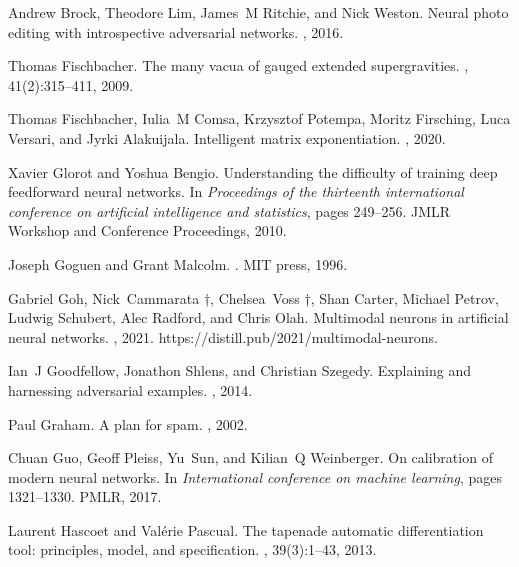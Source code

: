 \documentclass[11pt]{article}
\begin{document}
\begin{thebibliography}{10}

Andrew Brock, Theodore Lim, James~M Ritchie, and Nick Weston.
\newblock Neural photo editing with introspective adversarial networks.
, 2016.

Thomas Fischbacher.
\newblock The many vacua of gauged extended supergravities.
, 41(2):315--411, 2009.

Thomas Fischbacher, Iulia~M Comsa, Krzysztof Potempa, Moritz Firsching, Luca
  Versari, and Jyrki Alakuijala.
\newblock Intelligent matrix exponentiation.
, 2020.

Xavier Glorot and Yoshua Bengio.
\newblock Understanding the difficulty of training deep feedforward neural
  networks.
\newblock In {\em Proceedings of the thirteenth international conference on
  artificial intelligence and statistics}, pages 249--256. JMLR Workshop and
  Conference Proceedings, 2010.

Joseph Goguen and Grant Malcolm.
.
\newblock MIT press, 1996.

Gabriel Goh, Nick~Cammarata †, Chelsea~Voss †, Shan Carter, Michael Petrov,
  Ludwig Schubert, Alec Radford, and Chris Olah.
\newblock Multimodal neurons in artificial neural networks.
, 2021.
\newblock https://distill.pub/2021/multimodal-neurons.

Ian~J Goodfellow, Jonathon Shlens, and Christian Szegedy.
\newblock Explaining and harnessing adversarial examples.
, 2014.

Paul Graham.
\newblock A plan for spam.
, 2002.

Chuan Guo, Geoff Pleiss, Yu~Sun, and Kilian~Q Weinberger.
\newblock On calibration of modern neural networks.
\newblock In {\em International conference on machine learning}, pages
  1321--1330. PMLR, 2017.

Laurent Hascoet and Val{\'e}rie Pascual.
\newblock The tapenade automatic differentiation tool: principles, model, and
  specification.
, 39(3):1--43,
  2013.


\end{thebibliography}
\end{document}
